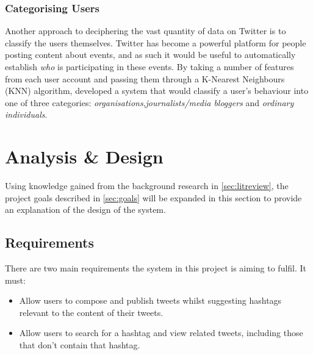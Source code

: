 \documentclass[12pt,a4paper]{article}
\begin{document}
\subsubsection{Categorising Users}
Another approach to deciphering the vast quantity of data on Twitter is to classify the users themselves. Twitter has become a powerful platform for people posting content about events, and as such it would be useful to automatically establish \emph{who} is participating in these events. By taking a number of features from each user account and passing them through a K-Nearest Neighbours (KNN) algorithm, \textcite{DeChoudhury:2012} developed a system that would classify a user's behaviour into one of three categories: \emph{organisations},\emph{journalists/media bloggers} and \emph{ordinary individuals}.

\pagebreak

\section{Analysis \& Design}
Using knowledge gained from the background research in \autoref{sec:litreview}, the project goals described in \autoref{sec:goals} will be expanded in this section to provide an explanation of the design of the system.

\subsection{Requirements}
There are two main requirements the system in this project is aiming to fulfil. It must:
\begin{itemize}
    \item Allow users to compose and publish tweets whilst suggesting hashtags relevant to the content of their tweets.
    \item Allow users to search for a hashtag and view related tweets, including those that don't contain that hashtag.
\end{itemize}
\end{document}
